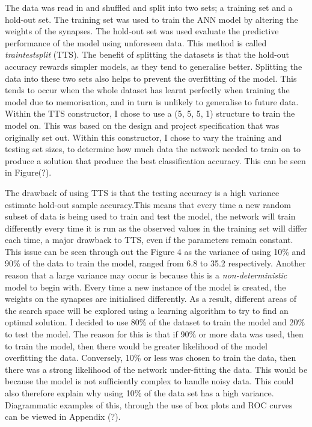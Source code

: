 \documentclass[11pt]{article}
\begin{document}
The data was read in and shuffled and split into two sets;  a training set and a hold-out set. The training set was used to train the ANN model by altering the weights of the synapses. The hold-out set was used evaluate the predictive performance of the model using unforeseen data. This method is called \textit{train\textunderscore test\textunderscore split} (TTS). The benefit of splitting the datasets is that the hold-out accuracy rewards simpler models, as they tend to generalise better. Splitting the data into these two sets also helps to prevent the overfitting of the model. This tends to occur when the whole dataset has learnt perfectly when training the model due to memorisation, and in turn is unlikely to generalise to future data.
Within the TTS constructor, I chose to use a (5, 5, 5, 1) structure to train the model on. This was based on the design and project specification that was originally set out. Within this constructor, I chose to vary the training and testing set sizes, to determine how much data the network needed to train on to produce a solution that produce the best classification accuracy. This can be seen in Figure(?). 

The drawback of using TTS is that the testing accuracy is a high variance estimate hold-out sample accuracy.This means that every time a new random subset  of data is being used to train and test the model,  the network will train differently every time it is run as the observed values in the training set will differ each time, a major drawback to TTS, even if the parameters remain constant. 
This issue can be seen through out the Figure 4 as the variance of using 10\% and  90\% of the data to train the model, ranged from 6.8 to 35.2 respectively.  Another reason that a large variance may occur is because this is a \textit{non-deterministic} model to begin with. Every time a new instance of the model is created, the weights on the synapses are initialised differently. As a result, different areas of the search space will be explored using a learning algorithm to try to find an optimal solution. 
I decided to use 80\% of the dataset to train the model and 20\% to test the model. The reason for this is that if 90\% or more data was used, then to train the model, then there would be greater likelihood of the model overfitting the data. Conversely, 10\% or less was chosen to train the data, then there was a strong likelihood of the network under-fitting the data. This would be because the model is not sufficiently complex to handle noisy data. This could also therefore explain why using 10\% of the data set has a high variance. Diagrammatic examples of this, through the use of box plots and ROC curves can be viewed in Appendix (?). 
\end{document}
